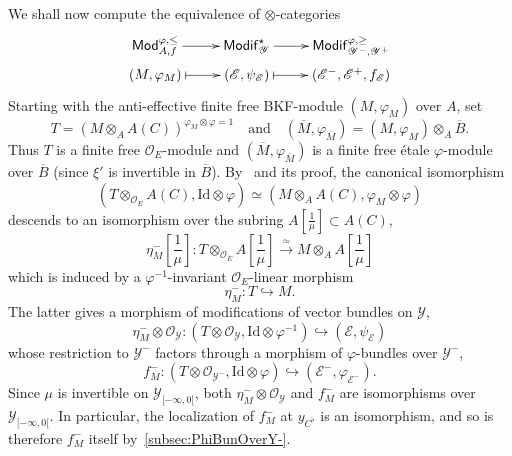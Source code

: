 \documentclass[11pt]{article}
\theoremstyle{definition}
\numberwithin{equation}{section}
\numberwithin{figure}{section}
\numberwithin{table}{section}
\newcommand{\Mod}{\mathsf{Mod}}
\newcommand{\Modif}{\mathsf{Modif}}
\begin{document}
We shall now compute the equivalence of $\otimes$-categories
\[
\xymatrix@R=0.2pc{\Mod_{A,f}^{\varphi,\leq}\ar[r] & \Modif_{\mathscr{Y}}^{\star}\ar[r] & \Modif_{\mathscr{Y}^{-},\mathscr{Y}^{+}}^{\varphi,\geq}\\
(M,\varphi_{M})\ar@{|->}[r] & \left(\mathscr{E},\psi_{\mathscr{E}}\right)\ar@{|->}[r] & \left(\mathscr{E}^{-},\mathscr{E}^{+},f_{\mathscr{E}}\right) }
\]
Starting with the anti-effective finite free BKF-module $(M,\varphi_{M})$ over $A$, set
\[
T=(M\otimes_{A}A(C))^{\varphi_{M}\otimes\varphi=1}\quad\text{and}\quad(\overline{M},\varphi_{\overline{M}})=(M,\varphi_{M})\otimes_{A}\overline{B}.
\]
Thus $T$ is a finite free $\mathcal{O}_{E}$-module and $(\overline{M},\varphi_{\overline{M}})$ is a finite free \'etale $\varphi$-module over $\overline{B}$ (since $\xi'$ is invertible in $\overline{B}$). By~\cite[4.26]{BaMoSc16} and its proof, the canonical isomorphism
\[
\left(T\otimes_{\mathcal{O}_{E}}A(C),\mathrm{Id}\otimes\varphi\right)\simeq\left(M\otimes_{A}A(C),\varphi_{M}\otimes\varphi\right)
\]
descends to an isomorphism over the subring $A[\frac{1}{\mu}]\subset A(C)$,
\[
\eta_{M}^{-}\!\left[\frac{1}{\mu}\right]:T\otimes_{\mathcal{O}_{E}}A\!\left[{\frac{1}{\mu}}\right]\stackrel{\simeq}{\longrightarrow}M\otimes_{A}A\!\left[{\frac{1}{\mu}}\right]
\]
which is induced by a $\varphi^{-1}$-invariant $\mathcal{O}_{E}$-linear morphism
\[
\eta_{M}^{-}:T\hookrightarrow M.
\]
The latter gives a morphism of modifications of vector bundles on $\mathscr{Y}$,
\[
\eta_{M}^{-}\otimes\mathscr{O}_{\mathscr{Y}}:\left(T\otimes\mathscr{O}_{\mathscr{Y}},\mathrm{Id}\otimes\varphi^{-1}\right)\hookrightarrow\left(\mathscr{E},\psi_{\mathscr{E}}\right)
\]
whose restriction to $\mathscr{Y}^{-}$ factors through a morphism of $\varphi$-bundles over $\mathscr{Y}^{-}$,
\[
f_{M}^{-}:\left(T\otimes\mathscr{O}_{\mathscr{Y}^{-}},\mathrm{Id}\otimes\varphi\right)\hookrightarrow\left(\mathscr{E}^{-},\varphi_{\mathscr{E}^{-}}\right).
\]
Since $\mu$ is invertible on $\mathscr{Y}_{[-\infty,0[}$, both $\eta_{M}^{-}\otimes\mathscr{O}_{\mathscr{Y}}$ and $f_{M}^{-}$ are isomorphisms over $\mathscr{Y}_{[-\infty,0[}$. In particular, the localization of $f_{M}^{-}$ at $y_{C^{\flat}}$ is an isomorphism, and so is therefore $f_{M}^{-}$ itself by~\ref{subsec:PhiBunOverY-}.
\end{document}
